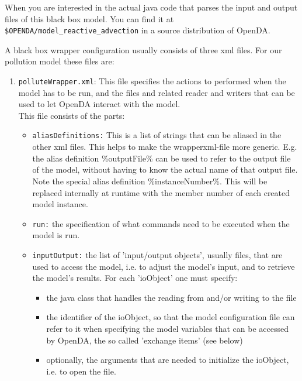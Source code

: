 When you are interested in the actual java code that parses the input and output files of this black box model. You can find it at \\
{\tt \$OPENDA/model\_reactive\_advection} in a source distribution of OpenDA.

A black box wrapper configuration usually consists of three xml files. For our
pollution model these files are:
\begin{enumerate}
   \item {\tt polluteWrapper.xml}: This file specifies the actions to performed
     when the model has to be run, and the files and related reader and writers
     that can be used to let OpenDA interact with the model.\\ This file
     consists of the parts:
     \begin{itemize}
        \item {\tt aliasDefinitions:} This is a list of strings that can be
          aliased in the other xml files. This helps to make the
          wrapperxml-file more generic. E.g. the alias definition
          \%outputFile\% can be used to refer to the output file of the model,
          without having to know the actual name of that output file.\\ Note
          the special alias definition \%instanceNumber\%. This will be
          replaced internally at runtime with the member number of each created
          model instance.
        \item {\tt run:} the specification of what commands need to be executed
          when the model is run.
        \item {\tt inputOutput:} the list of 'input/output objects', usually
          files, that are used to access the model, i.e. to adjust the model's
          input, and to retrieve the model's results. For each 'ioObject' one
          must specify:
        \begin{itemize}
           \item the java class that handles the reading from and/or writing to
             the file
           \item the identifier of the ioObject, so that the model
             configuration file can refer to it when specifying the model
             variables that can be accessed by OpenDA, the so called 'exchange
             items' (see below)
           \item optionally, the arguments that are needed to initialize the
             ioObject, i.e. to open the file.
        \end{itemize}

\end{itemize}
\end{enumerate}

